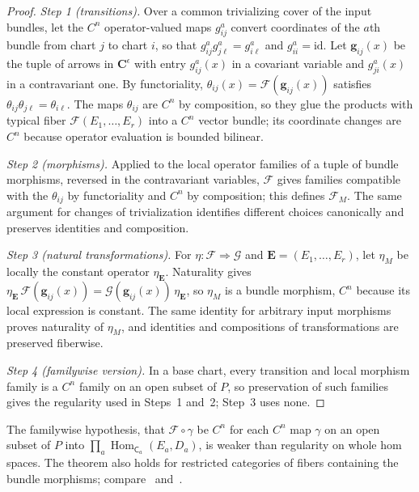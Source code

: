 \documentclass[11pt]{amsart}
\theoremstyle{definition}
\theoremstyle{remark}
\numberwithin{equation}{section}
\newcommand{\id}{\mathrm{id}}
\theoremstyle{plain}
\theoremstyle{definition}
\theoremstyle{plain}
\begin{document}
\begin{proof}
\emph{Step 1 (transitions).} Over a common trivializing cover of the input bundles, let the $C^n$ operator-valued maps $g^a_{ij}$ convert coordinates of the $a$th bundle from chart $j$ to chart $i$, so that $g^a_{ij}g^a_{j\ell}=g^a_{i\ell}$ and $g^a_{ii}=\id$. Let $\mathbf g_{ij}(x)$ be the tuple of arrows in $\mathbf C^\epsilon$ with entry $g^a_{ij}(x)$ in a covariant variable and $g^a_{ji}(x)$ in a contravariant one. By functoriality, $\theta_{ij}(x)=\mathcal F(\mathbf g_{ij}(x))$ satisfies $\theta_{ij}\theta_{j\ell}=\theta_{i\ell}$. The maps $\theta_{ij}$ are $C^n$ by composition, so they glue the products with typical fiber $\mathcal F(E_1,\ldots,E_r)$ into a $C^n$ vector bundle; its coordinate changes are $C^n$ because operator evaluation is bounded bilinear.

\emph{Step 2 (morphisms).} Applied to the local operator families of a tuple of bundle morphisms, reversed in the contravariant variables, $\mathcal F$ gives families compatible with the $\theta_{ij}$ by functoriality and $C^n$ by composition; this defines $\mathcal F_M$. The same argument for changes of trivialization identifies different choices canonically and preserves identities and composition.

\emph{Step 3 (natural transformations).} For $\eta\colon\mathcal F\Rightarrow\mathcal G$ and $\mathbf E=(E_1,\ldots,E_r)$, let $\eta_M$ be locally the constant operator $\eta_{\mathbf E}$. Naturality gives $\eta_{\mathbf E}\,\mathcal F(\mathbf g_{ij}(x))=\mathcal G(\mathbf g_{ij}(x))\,\eta_{\mathbf E}$, so $\eta_M$ is a bundle morphism, $C^n$ because its local expression is constant. The same identity for arbitrary input morphisms proves naturality of $\eta_M$, and identities and compositions of transformations are preserved fiberwise.

\emph{Step 4 (familywise version).} In a base chart, every transition and local morphism family is a $C^n$ family on an open subset of $P$, so preservation of such families gives the regularity used in Steps~1 and~2; Step~3 uses none.
\end{proof}

The familywise hypothesis, that $\mathcal F\circ\gamma$ be $C^n$ for each $C^n$ map $\gamma$ on an open subset of $P$ into $\prod_a\operatorname{Hom}_{\mathsf C_a}(E_a,D_a)$, is weaker than regularity on whole hom spaces. The theorem also holds for restricted categories of fibers containing the bundle morphisms; compare~\cite{G2,La} and~\cite[n\textsuperscript{os}~7.6.1--7.6.4]{Bou}.
\end{document}
